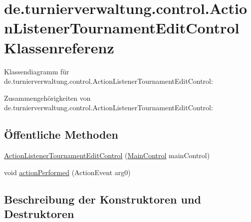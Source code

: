 \hypertarget{classde_1_1turnierverwaltung_1_1control_1_1_action_listener_tournament_edit_control}{}\section{de.\+turnierverwaltung.\+control.\+Action\+Listener\+Tournament\+Edit\+Control Klassenreferenz}
\label{classde_1_1turnierverwaltung_1_1control_1_1_action_listener_tournament_edit_control}


Klassendiagramm für de.\+turnierverwaltung.\+control.\+Action\+Listener\+Tournament\+Edit\+Control\+:


Zusammengehörigkeiten von de.\+turnierverwaltung.\+control.\+Action\+Listener\+Tournament\+Edit\+Control\+:
\subsection*{Öffentliche Methoden}
\begin{DoxyCompactItemize}
\item 
\hyperlink{classde_1_1turnierverwaltung_1_1control_1_1_action_listener_tournament_edit_control_a2dff072763496ce4249768e59150457c}{Action\+Listener\+Tournament\+Edit\+Control} (\hyperlink{classde_1_1turnierverwaltung_1_1control_1_1_main_control}{Main\+Control} main\+Control)
\item 
void \hyperlink{classde_1_1turnierverwaltung_1_1control_1_1_action_listener_tournament_edit_control_a3c8f9db7a61e16aea9590028b7763f72}{action\+Performed} (Action\+Event arg0)
\end{DoxyCompactItemize}


\subsection{Beschreibung der Konstruktoren und Destruktoren}
